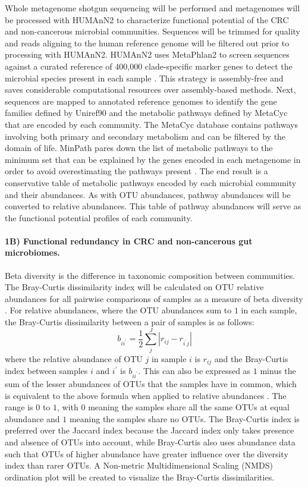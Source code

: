 \documentclass[11pt]{article}
\begin{document}
Whole metagenome shotgun sequencing will be performed and metagenomes will be processed with HUMAnN2 \cite{franzosa_species-level_2018} to characterize functional potential of the CRC and non-cancerous microbial communities.
Sequences will be trimmed for quality and reads aligning to the human reference genome will be filtered out prior to processing with HUMAnN2.
HUMAnN2 uses MetaPhlan2 to screen sequences against a curated reference of 400,000 clade-specific marker genes to detect the microbial species present in each sample \cite{segata_metagenomic_2012}.
This strategy is assembly-free and saves considerable computational resources over assembly-based methods.
Next, sequences are mapped to annotated reference genomes to identify the gene families defined by Uniref90 and the metabolic pathways defined by MetaCyc \cite{caspi_metacyc_2018} that are encoded by each community.
The MetaCyc database contains pathways involving both primary and secondary metabolism and can be filtered by the domain of life.
MinPath pares down the list of metabolic pathways to the minimum set that can be explained by the genes encoded in each metagenome in order to avoid overestimating the pathways present \cite{ye_parsimony_2009}.
The end result is a conservative table of metabolic pathways encoded by each microbial community and their abundances.
As with OTU abundances, pathway abundances will be converted to relative abundances.
This table of pathway abundances will serve as the functional potential profiles of each community.


\paragraph{1B) Functional redundancy in CRC and non-cancerous gut microbiomes.}

Beta diversity is the difference in taxonomic composition between communities.
The Bray-Curtis dissimilarity index will be calculated on OTU relative abundances for all pairwise comparisons of samples as a measure of beta diversity \cite{bray_ordination_1957}.
For relative abundances, where the OTU abundances sum to $1$ in each sample, the Bray-Curtis dissimilarity between a pair of samples is as follows:
$$b_{i i^\prime } = \frac{1}{2} \sum_{j}^J | r_{ij} - r_{i^\prime j} |$$
where the relative abundance of OTU $j$ in sample $i$ is $r_{ij}$ and the Bray-Curtis index between samples $i$ and $i^\prime$ is $b_{i i^\prime }$.
This can also be expressed as $1$ minus the sum of the lesser abundances of OTUs that the samples have in common, which is equivalent to the above formula when applied to relative abundances \cite{greenacre_multivariate_2014}.
The range is $0$ to $1$, with $0$ meaning the samples share all the same OTUs at equal abundance and $1$ meaning the samples share no OTUs.
The Bray-Curtis index is preferred over the Jaccard index because the Jaccard index only takes presence and absence of OTUs into account, while Bray-Curtis also uses abundance data such that OTUs of higher abundance have greater influence over the diversity index than rarer OTUs.
A Non-metric Multidimensional Scaling (NMDS) ordination plot will be created to visualize the Bray-Curtis dissimilarities.
\end{document}
